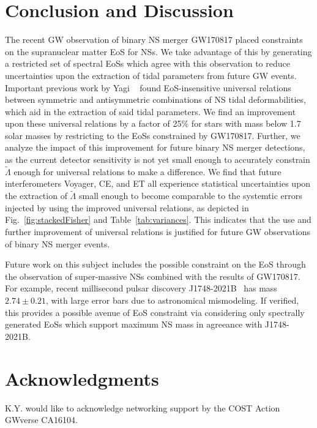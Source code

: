 \documentclass[prd,twocolumn,nofootinbib,superscriptaddress,amsmath,amssymb]{revtex4-1}
\begin{document}
\section{Conclusion and Discussion}\label{sec:conclusion}
The recent GW observation of binary NS merger GW170817 placed constraints on the supranuclear matter EoS for NSs.
We take advantage of this by generating a restricted set of spectral EoSs which agree with this observation to reduce uncertainties upon the extraction of tidal parameters from future GW events.
Important previous work by Yagi ~\cite{Yagi:ILQ,Yagi:binLove} found EoS-insensitive universal relations between symmetric and antisymmetric combinations of NS tidal deformabilities, which aid in the extraction of said tidal parameters.
We find an improvement upon these universal relations by a factor of 25\% for stars with mass below 1.7 solar masses by restricting to the EoSs constrained by GW170817.
Further, we analyze the impact of this improvement for future binary NS merger detections, as the current detector sensitivity is not yet small enough to accurately constrain $\tilde{\Lambda}$ enough for universal relations to make a difference.
We find that future interferometers Voyager, CE, and ET all experience statistical uncertainties upon the extraction of $\tilde{\Lambda}$ small enough to become comparable to the systemtic errors injected by using the improved universal relations, as depicted in Fig.~\ref{fig:stackedFisher} and Table~\ref{tab:variances}.
This indicates that the use and further improvement of universal relations is justified for future GW observations of binary NS merger events.

Future work on this subject includes the possible constraint on the EoS through the observation of super-massive NSs combined with the results of GW170817.
For example, recent millisecond pulsar discovery J1748-2021B~\cite{Freire:superMassiveNS} has mass $2.74 \pm 0.21$, with large error bars due to astronomical mismodeling.
If verified, this provides a possible avenue of EoS constraint via considering only spectrally generated EoSs which support maximum NS mass in agreeance with J1748-2021B.

\section*{Acknowledgments}\label{acknowledgments}
K.Y. would like to acknowledge networking support by the COST Action
GWverse CA16104. 


\end{document}
